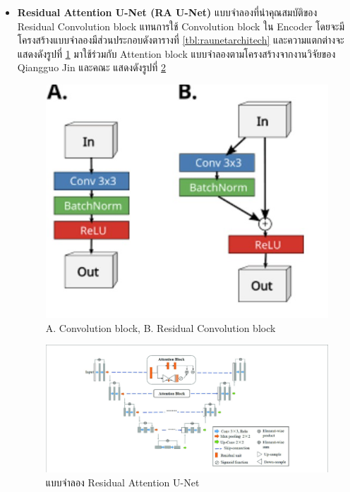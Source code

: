 \documentclass[12pt,oneside,openright,a4paper]{cpe-thai-project}
\begin{document}
\begin{itemize}
\item \textbf{Residual Attention U-Net (RA U-Net)} 
แบบจำลองที่นำคุณสมบัติของ Residual Convolution block แทนการใช้ Convolution block ใน Encoder โดยจะมีโครงสร้างแบบจำลองมีส่วนประกอบดังตารางที่ \ref{tbl:raunetarchitech} และความแตกต่างจะแสดงดังรูปที่ \ref{fig:cv2r} มาใช้ร่วมกับ Attention block แบบจำลองตามโครงสร้างจากงานวิจัยของ Qiangguo Jin และคณะ \cite{RAUNet} แสดงดังรูปที่ \ref{fig:RAUnet-arch}
\begin{figure}[!h]
    \centering
    \includegraphics[scale=0.25]{images/cv2d_rs_cv2d.jpg}
    \caption[A. Convolution block, B. Residual Convolution block]{A. Convolution block, B. Residual Convolution block \cite{RAUNet}}
    \label{fig:cv2r}
\end{figure}

\begin{figure}[!h]
    \centering
    \includegraphics[scale=0.35]{images/Architecture-of-residual-attention-U-net-RA-Unet.png}
    \caption[แบบจำลอง Residual Attention U-Net]{แบบจำลอง Residual Attention U-Net \cite{RAUNet}}
    \label{fig:RAUnet-arch}
\end{figure}
\pagebreak


\end{itemize}
\end{document}
